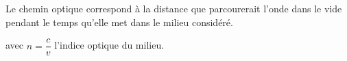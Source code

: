 ﻿\documentclass[a4paper]{article}
\begin{document}
\pagestyle{fancy}
\fancyhf{}
\setlength{\headheight}{15pt}

\begin{center}
	\large{}
\end{center}


Le chemin optique correspond à la distance que parcourerait l’onde dans le vide pendant le temps qu’elle met dans le milieu considéré.\par
{} avec \(n=\dfrac{c}{v}\) l'indice optique du milieu.
\end{document}
